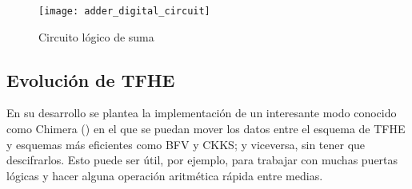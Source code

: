 \begin{figure}[h]
    \centering
    \texttt{[image: adder\_digital\_circuit]}
    \caption{Circuito lógico de suma}
    \label{fig:adder_digital_circuit}
\end{figure}
 

\subsection{Evolución de TFHE}

En su desarrollo se plantea la implementación de un interesante modo conocido como Chimera (\cite{boura_chimera:_2018}) en el que se puedan mover los datos entre el esquema de TFHE y esquemas más eficientes como BFV y CKKS; y viceversa, sin tener que descifrarlos. Esto puede ser útil, por ejemplo, para trabajar con muchas puertas lógicas y hacer alguna operación aritmética rápida entre medias.
